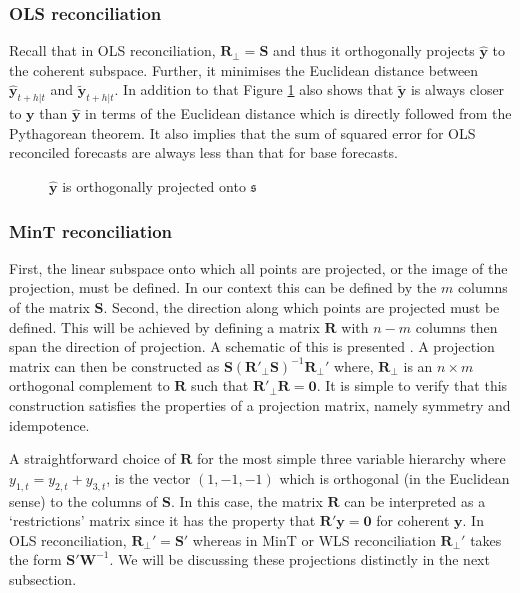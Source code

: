 \documentclass[12pt]{article}
\theoremstyle{definition}
\theoremstyle{property}
\begin{document}
	\subsubsection{OLS reconciliation}
	
	Recall that in OLS reconciliation, $\bm{R}_\perp=\bm{S}$ and thus it orthogonally projects $\hat{\bm{y}}$ to the coherent subspace. Further, it minimises the Euclidean distance between $\hat{\bm{y}}_{t+h|t}$ and $\tilde{\bm{y}}_{t+h|t}$. In addition to that Figure \ref{fig:Schematic_OLSRecon} also shows that $\tilde{\bm{y}}$ is always closer to $\bm{y}$ than $\hat{\bm{y}}$ in terms of the Euclidean distance which is directly followed from the Pythagorean theorem. It also implies that the sum of squared error for OLS reconciled forecasts are always less than that for base forecasts.    
	
	\clearpage		
	\begin{figure}[!ht]
		\centering
		\vspace{-0.9cm}
		\tiny
		\resizebox{\linewidth}{!}{
			
		}
		\caption{$\hat{\bm{y}}$ is orthogonally projected onto $\mathfrak{s}$ }\label{fig:Schematic_OLSRecon}
	\end{figure}
	
	\subsubsection{MinT reconciliation}
	
	    First, the linear subspace onto which all points are projected, or the image of the projection, must be defined. In our context this can be defined by the $m$ columns of the matrix $\bm{S}$.  Second, the direction along which points are projected must be defined.  This will be achieved by defining a matrix $\bm{R}$ with $n-m$ columns then span the direction of projection. A schematic of this is presented .   A projection matrix can then be constructed as $\bm{S}({\bm{R}'_{\perp}}\bm{S})^{-1}\bm{R}_{\perp}'$ where, ${\bm{R}_{\perp}}$ is an $n\times m$ orthogonal complement to $\bm{R}$ such that ${\bm{R}'_{\perp}}\bm{R}=\bm{0}$. It is simple to verify that this construction satisfies the properties of a projection matrix, namely symmetry and idempotence.
	
	A straightforward choice of $\bm{R}$ for the most simple three variable hierarchy where $y_{1,t}=y_{2,t}+y_{3,t}$, is the vector $(1,-1,-1)$ which is orthogonal (in the Euclidean sense) to the columns of $\bm{S}$. In this case, the matrix $\bm{R}$ can be interpreted as a `restrictions' matrix since it has the property that $\bm{R}'\bm{y}=\bm{0}$ for coherent $\bm{y}$. In OLS reconciliation, $\bm{R}_{\perp}'= \bm{S}'$ whereas in MinT or WLS reconciliation $\bm{R}_{\perp}'$ takes the form $\bm{S'W}^{-1}$. We will be discussing these projections distinctly in the next subsection. 
	
\end{document}
